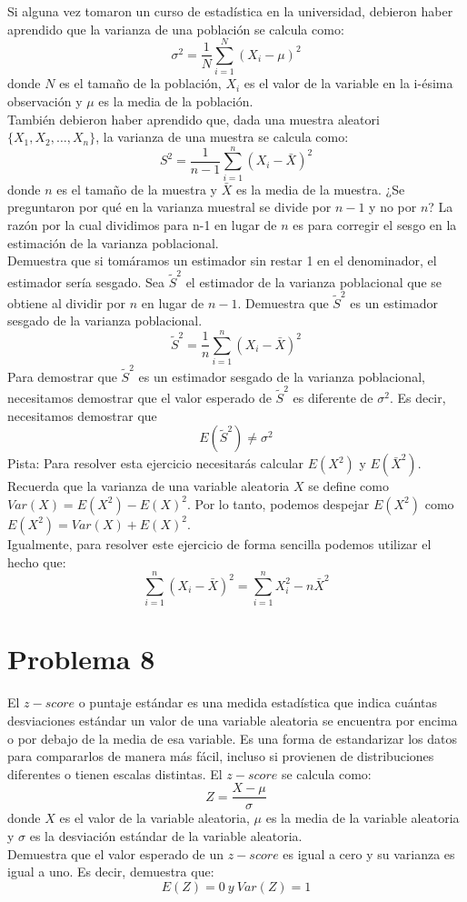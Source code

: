 \documentclass[]{article}
\begin{document}
Si alguna vez tomaron un curso de estadística en la universidad, debieron haber aprendido que la varianza de una población se calcula como: 
$$
\sigma^2=
	\frac{1}{N} 
	\sum_{i=1}^{N}
	(X_i-\mu)^2
$$
donde $N$ es el tamaño de la población, $X_i$ es el valor de la variable en la i-ésima observación y $\mu$ es la media de la población.
\\
También debieron haber aprendido que, dada una muestra aleatori $\{X_1, X_2, \ldots, X_n\}$, la varianza de una muestra se calcula como:
$$
S^2=
	\frac{1}{n-1}
	\sum_{i=1}^{n}
	(X_i-\bar{X})^2
$$
donde $n$ es el tamaño de la muestra y $\bar{X}$ es la media de la muestra. ¿Se preguntaron por qué en la varianza muestral se divide por $n-1$ y no por $n$? La razón por la cual dividimos para n-1 en lugar de $n$ es para corregir el sesgo en la estimación de la varianza poblacional.
\\
Demuestra que si tomáramos un estimador sin restar 1 en el denominador, el estimador sería sesgado. Sea $\tilde{S}^2$ el estimador de la varianza poblacional que se obtiene al dividir por $n$ en lugar de $n-1$. Demuestra que $\tilde{S}^2$ es un estimador sesgado de la varianza poblacional.
$$
\tilde{S}^2=
	\frac{1}{n}
	\sum_{i=1}^{n}	
	(X_i-\bar{X})^2
$$
Para demostrar que $\tilde{S}^2$ es un estimador sesgado de la varianza poblacional, necesitamos demostrar que el valor esperado de $\tilde{S}^2$ es diferente de $\sigma^2$. Es decir, necesitamos demostrar que
$$
E(\tilde{S}^2)\neq\sigma^2
$$
Pista: Para resolver esta ejercicio necesitarás calcular $E(X^2)$ y $E(\bar{X}^2)$. Recuerda que la varianza de una variable aleatoria $X$ se define como $Var(X)=E(X^2)-E(X)^2$. Por lo tanto, podemos despejar $E(X^2)$ como $E(X^2)=Var(X)+E(X)^2$.
\\
Igualmente, para resolver este ejercicio de forma sencilla podemos utilizar el hecho que: 
$$
\sum_{i=1}^{n} (X_i-\bar{X})^2=
	\sum_{i=1}^{n}
	X_{i}^{2}
	-
	n
	\bar{X}^2
$$ 

\section*{Problema 8}

El $z-score$ o puntaje estándar es una medida estadística que indica cuántas desviaciones estándar un valor de una variable aleatoria se encuentra por encima o por debajo de la media de esa variable. Es una forma de estandarizar los datos para compararlos de manera más fácil, incluso si provienen de distribuciones diferentes o tienen escalas distintas. El $z-score$ se calcula como:
$$
Z=
\frac{X-\mu}{\sigma}
$$
donde $X$ es el valor de la variable aleatoria, $\mu$ es la media de la variable aleatoria y $\sigma$ es la desviación estándar de la variable aleatoria. 
\\
Demuestra que el valor esperado de un $z-score$ es igual a cero y su varianza es igual a uno. Es decir, demuestra que: 
$$
E(Z)=0 \ y \ Var(Z)=1
$$
\end{document}
